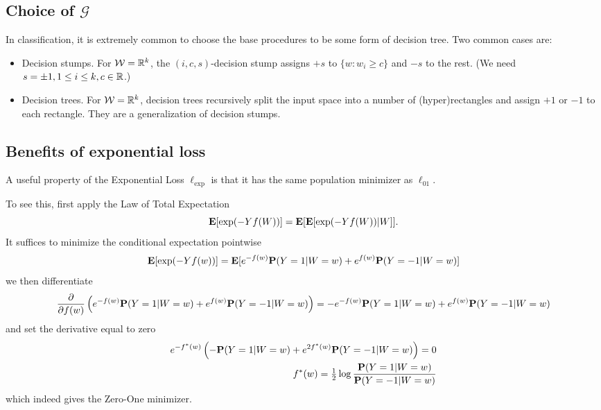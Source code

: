 \subsection{Choice of $\mathcal{G}$}
In classification, it is extremely common to choose the base procedures to be some form of decision tree. Two common cases are:
\begin{itemize}
	\item Decision stumps. For $\mathcal{W} = \mathbb{R}^k$, the $(i, c, s)$-decision stump assigns $+s$ to $\{w : w_i \ge c\}$ and $-s$ to the rest. (We need $s=\pm 1, 1 \le i \le k, c \in \mathbb{R}$.)
	\item Decision trees. For $\mathcal{W} = \mathbb{R}^k$, decision trees recursively split the input space into a number of (hyper)rectangles and assign $+1$ or $-1$ to each rectangle. They are a generalization of decision stumps.
\end{itemize}

\subsection{Benefits of exponential loss}
A useful property of the Exponential Loss $\ell_\text{exp}$ is that it has the same population minimizer as $\ell_{01}$.

To see this, first apply the Law of Total Expectation
\begin{equation*}
	\mathbf{E}[\exp(-Yf(W))] = \mathbf{E}[\mathbf{E}[\exp(-Yf(W))|W]].
\end{equation*}
It suffices to minimize the conditional expectation pointwise
\begin{equation*}
	\mathbf{E}[\exp(-Yf(w))] = \mathbf{E}[e^{-f(w)}\mathbf{P}(Y=1|W=w) + e^{f(w)}\mathbf{P}(Y=-1|W=w)]
\end{equation*}
we then differentiate
\begin{equation*}
	\frac{\partial}{\partial f(w)} \left( e^{-f(w)}\mathbf{P}(Y=1|W=w) + e^{f(w)}\mathbf{P}(Y=-1|W=w) \right) = -e^{-f(w)}\mathbf{P}(Y=1|W=w) + e^{f(w)}\mathbf{P}(Y=-1|W=w)
\end{equation*}
and set the derivative equal to zero
\begin{align*}
	e^{-f^*(w)} \left( -\mathbf{P}(Y=1|W=w) + e^{2f^*(w)}\mathbf{P}(Y=-1|W=w) \right) = 0 \\
	f^*(w) = \tfrac{1}{2}\log \frac{\mathbf{P}(Y=1|W=w)}{\mathbf{P}(Y=-1|W=w)}
\end{align*}
which indeed gives the Zero-One minimizer.

